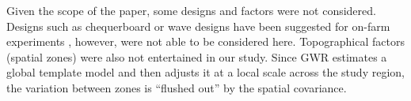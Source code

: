 \documentclass[a4paper]{article} 	%
\begin{document}


Given the scope of the paper, some designs and factors were not considered. Designs such as chequerboard or wave designs have been suggested for on-farm experiments \parencite{bramley1999designing}, however, were not able to be considered here. Topographical factors (spatial zones) were also not entertained in our study. Since GWR estimates a global template model and then adjusts it at a local scale across the study region, the variation between zones is ``flushed out'' by the spatial covariance.


\end{document}
